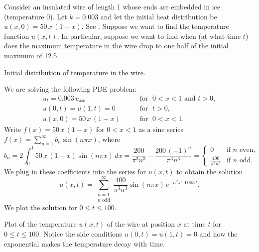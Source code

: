 \begin{example}
Consider
an insulated wire of length 1 whose
ends are embedded in ice (temperature 0).
Let $k=0.003$ and let the initial heat distribution
be $u(x,0) = 50\,x\,(1-x)$.
See .
Suppose we want to find the temperature function $u(x,t)$.
In particular, suppose we
want to find when (at what time $t$)
does the maximum temperature in the wire 
drop to one half of the initial maximum of 12.5.

\begin{myfig}
\capstart
{}
\caption{Initial distribution of temperature in the
wire.\label{heat:wireexinitfig}}
\end{myfig}

We are solving the following PDE problem:
\begin{equation*}
\begin{array}{ll}
u_t = 0.003 \, u_{xx} & \qquad \text{for } \; 0 < x < 1 \text{ and } t > 0, \\
u(0,t) = u(1,t) = 0 & \qquad \text{for } \; t > 0, \\
u(x,0) = 50\,x\,(1-x) & \qquad \text{for } \; 0 < x < 1 .
\end{array}
\end{equation*}
Write $f(x) = 50\,x\,(1-x)$ for $0 < x < 1$ as a sine series
$f(x) = \sum_{n=1}^\infty b_n \sin (n \pi x)$,
where
\begin{equation*}
b_n = 2 \int_0^1 50\,x\,(1-x) \sin (n \pi x) \,dx
= 
\frac{200}{{\pi }^{3}{n}^{3}}-\frac{200\,{\left( -1\right) }^{n}}{{\pi }^{3}{n}^{3}}
=
\begin{cases}
0 & \text{if } n \text{ even} , \\
\frac{400}{\pi^3 n^3} & \text{if } n \text{ odd} .
\end{cases}
\end{equation*}
We plug in these coefficients into the series for $u(x,t)$ to obtain the
solution
\begin{equation*}
u(x,t) = 
\sum_{\substack{n=1 \\ n \text{ odd}}}^\infty
\frac{400}{\pi^3 n^3}
\sin (n \pi x )
\, e^{-n^2 \pi^2 \, 0.003 \, t} .
\end{equation*}
We plot the solution
 for $0 \leq t \leq 100$.

\begin{myfig}
\capstart
{}
\caption{Plot of the temperature $u(x,t)$ of the wire at position $x$
at time $t$ for $0 \leq t \leq 100$.  Notice the side conditions
$u(0,t)=u(1,t)=0$ and how the exponential makes the temperature decay
with time.\label{heat:wireexfig}}
\end{myfig}


\end{example}
